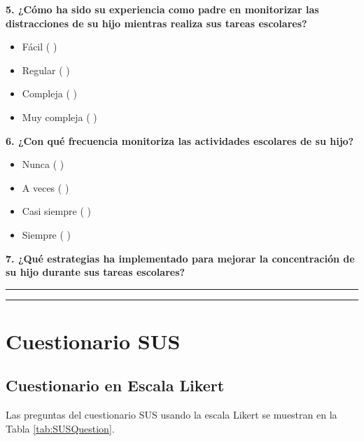 \documentclass[a4paper,fleqn]{cas-sc}
\begin{document}
	\noindent
	\textbf{5. ¿Cómo ha sido su experiencia como padre en monitorizar las distracciones de su hijo mientras realiza sus tareas escolares?}
	
	\begin{itemize}
		\item Fácil ( )
		\item Regular ( )
		\item Compleja ( )
		\item Muy compleja ( )
	\end{itemize}
	
	\noindent
	\textbf{6. ¿Con qué frecuencia monitoriza las actividades escolares de su hijo?}
	
	\begin{itemize}
		\item Nunca ( )
		\item A veces ( )
		\item Casi siempre ( )
		\item Siempre ( )
	\end{itemize}
	
	\noindent
	\textbf{7. ¿Qué estrategias ha implementado para mejorar la concentración de su hijo durante sus tareas escolares?}
	
	\vspace{12pt}
	\noindent
	\rule{\textwidth}{1pt}
	
	\vspace{12pt}
	\noindent
	\rule{\textwidth}{1pt}
	
	\clearpage
	\section[\appendixname~\thesection]{Cuestionario SUS}
	\label{Appendix:SUSQuestionarie}
	
	
	\subsection[\appendixname~\thesection]{Cuestionario en Escala Likert}
	\label{Appendix:LikertScale}
	Las preguntas del cuestionario SUS usando la escala Likert se muestran en la Tabla \ref{tab:SUSQuestion}.
	
\end{document}
